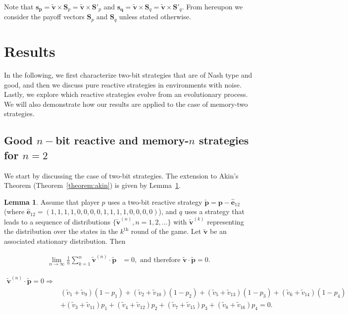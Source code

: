 \documentclass{article}
\theoremstyle{definition}
\newtheorem{lemma}[theorem]{Lemma}
\begin{document}
Note that \(\mathbf{s_{p}} = \mathbf{\tilde{v}} \times \mathbf{S}_{p} =
\mathbf{\tilde{v}} \times \mathbf{S}'_{p}\) and \(\mathbf{s_{q}} =\mathbf{\tilde{v}}
\times \mathbf{S}_{q} = \mathbf{\tilde{v}} \times \mathbf{S}'_{q}\). From
hereupon we consider the payoff vectors \(\mathbf{S}_{p}\) and
\(\mathbf{S}_{q}\) unless stated otherwise.

\section{Results}\label{section:results}

In the following, we first characterize two-bit strategies that
are of Nash type and good, and then we discuss pure reactive strategies in
environments with noise. Lastly, we explore which reactive strategies evolve
from an evolutionary process. We will also demonstrate how our results
are applied to the case of memory-two strategies.

\subsection{Good \(n-\)bit reactive and memory-\(n\) strategies for
\(n=2\)}\label{section:good_nash_strategies}

We start by discussing the case of two-bit strategies. The extension to Akin's
Theorem (Theorem~\ref{theorem:akin}) is given by Lemma~\ref{lemma:akin_extended}.

\begin{lemma}\label{lemma:akin_extended}
  Assume that player \(p\) uses a two-bit reactive strategy \(\mathbf{\tilde{p}} = \mathbf{p} - \mathbf{\hat{e}}_{1 2}\)
  (where \(\mathbf{\hat{e}}_{1 2} = (1, 1, 1, 1, \allowbreak 0,
  0, 0, 0, 1, 1, 1, 1, 0, 0, 0, 0)\)), and \(q\) uses a strategy that leads to a sequence
  of distributions \(\{\mathbf{\tilde{v}}^{(n)}, n = 1, 2, ...\}\) with
  \(\mathbf{\tilde{v}}^{(k)}\) representing the distribution over the states in the
  \(k^{\text{th}}\) round of the game. Let \(\mathbf{\tilde{v}}\) be an associated
  stationary distribution. Then

  \begin{align*}
    \lim_{n \rightarrow \infty} \frac{1}{n} \sum_{k=1}^{n} \mathbf{\tilde{v}}^{(n)} \cdot\mathbf{\tilde{p}} & = 0, \text{ and therefore } \mathbf{\tilde{v}} \cdot \mathbf{\tilde{p}} = 0.
  \end{align*}

  \begin{align}\label{eq:akin_extended}
  \mathbf{\tilde{v}}^{(n)} \cdot \mathbf{\tilde{p}} = 0 \Rightarrow & \nonumber \\
  & (\tilde{v}_{1} + \tilde{v}_{9}) (1 - p_1) + (\tilde{v}_{2} + \tilde{v}_{10}) (1 - p_2)  + (\tilde{v}_{5} + \tilde{v}_{13}) (1 - p_3) + (\tilde{v}_{6} + \tilde{v}_{14}) (1 - p_4) \nonumber \\
  & + (\tilde{v}_{3} + \tilde{v}_{11})p_1  + (\tilde{v}_{4} + \tilde{v}_{12})p_2 + (\tilde{v}_{7} + \tilde{v}_{15}) p_3 + (\tilde{v}_{8} + \tilde{v}_{16}) p_4 = 0.
  \end{align}
\end{lemma}
\end{document}
